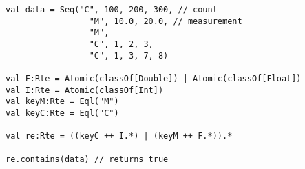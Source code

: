 \begin{lstlisting}[style=reclojureScala]
val data = Seq("C", 100, 200, 300, // count
                 "M", 10.0, 20.0, // measurement
                 "M",
                 "C", 1, 2, 3,
                 "C", 1, 3, 7, 8)

val F:Rte = Atomic(classOf[Double]) | Atomic(classOf[Float])
val I:Rte = Atomic(classOf[Int])
val keyM:Rte = Eql("M")
val keyC:Rte = Eql("C")

val re:Rte = ((keyC ++ I.*) | (keyM ++ F.*)).*

re.contains(data) // returns true
\end{lstlisting}
